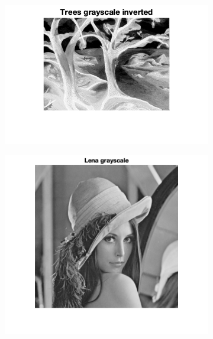 \documentclass{article}
\begin{document}
\begin{enumerate}
\begin{figure}
\begin{subfigure}[c]{0.45\textwidth}
            \includegraphics[width=\textwidth]{images/trees_gray_inv.png}
        \end{subfigure}
        \hfill
        \begin{subfigure}[c]{0.45\textwidth}
            \includegraphics[width=\textwidth]{images/lena_gray.png}
        \end{subfigure}
        \hfill
        \begin{subfigure}[c]{0.45\textwidth}

\end{subfigure}
\end{figure}
\end{enumerate}
\end{document}
